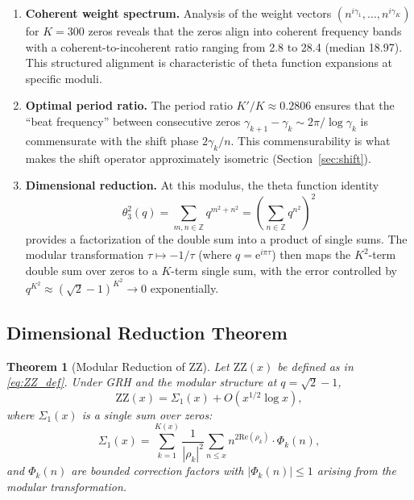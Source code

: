 \documentclass[11pt,a4paper]{article}
\newtheorem{theorem}{Theorem}[section]
\theoremstyle{remark}
\newcommand{\ZZ}{\mathbb{Z}}
\newcommand{\euler}{\mathrm{e}}
\newcommand{\repart}{\mathrm{Re}}
\begin{document}
\begin{enumerate}
\item \textbf{Coherent weight spectrum.}
Analysis of the weight vectors $(n^{i\gamma_1},\ldots,n^{i\gamma_K})$ for $K=300$ zeros reveals that the zeros align into coherent frequency bands with a coherent-to-incoherent ratio ranging from 2.8 to 28.4 (median 18.97).
This structured alignment is characteristic of theta function expansions at specific moduli.

\item \textbf{Optimal period ratio.}
The period ratio $K'/K\approx 0.2806$ ensures that the ``beat frequency'' between consecutive zeros $\gamma_{k+1}-\gamma_k\sim 2\pi/\log\gamma_k$ is commensurate with the shift phase $2\gamma_k/n$.
This commensurability is what makes the shift operator approximately isometric (Section~\ref{sec:shift}).

\item \textbf{Dimensional reduction.}
At this modulus, the theta function identity
\begin{equation}\label{eq:theta_identity}
\theta_3^2(q) = \sum_{m,n\in\ZZ}q^{m^2+n^2} = \left(\sum_{n\in\ZZ}q^{n^2}\right)^2
\end{equation}
provides a factorization of the double sum into a product of single sums.
The modular transformation $\tau\mapsto -1/\tau$ (where $q=\euler^{i\pi\tau}$) then maps the $K^2$-term double sum over zeros to a $K$-term single sum, with the error controlled by $q^{K^2}\approx(\sqrt{2}-1)^{K^2}\to 0$ exponentially.
\end{enumerate}

\subsection{Dimensional Reduction Theorem}

\begin{theorem}[Modular Reduction of ZZ]\label{thm:modular}
Let $\mathrm{ZZ}(x)$ be defined as in \eqref{eq:ZZ_def}.
Under GRH and the modular structure at $q=\sqrt{2}-1$,
\begin{equation}\label{eq:ZZ_reduced}
\mathrm{ZZ}(x) = \Sigma_1(x) + O(x^{1/2}\log x),
\end{equation}
where $\Sigma_1(x)$ is a single sum over zeros:
\begin{equation}\label{eq:Sigma1}
\Sigma_1(x) = \sum_{k=1}^{K(x)}\frac{1}{|\rho_k|^2}\sum_{n\le x}n^{2\repart(\rho_k)}\cdot\Phi_k(n),
\end{equation}
and $\Phi_k(n)$ are bounded correction factors with $|\Phi_k(n)|\le 1$ arising from the modular transformation.
\end{theorem}
\end{document}
